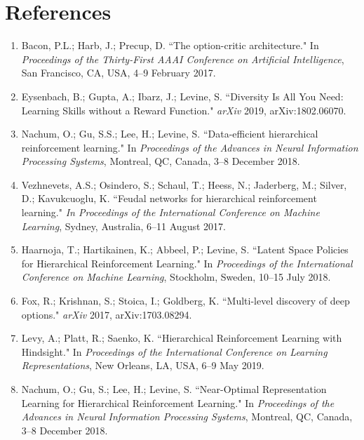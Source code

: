\documentclass[12pt]{article}
\begin{document}
\section{References}
\begin{enumerate}
\item Bacon, P.L.; Harb, J.; Precup, D. ``The option-critic architecture." In \textit{Proceedings of the Thirty-First AAAI Conference on Artificial Intelligence}, San Francisco, CA, USA, 4–9 February 2017.\label{ref140}

\item Eysenbach, B.; Gupta, A.; Ibarz, J.; Levine, S. ``Diversity Is All You Need: Learning Skills without a Reward Function." \textit{arXiv} 2019, arXiv:1802.06070.\label{ref148}

\item Nachum, O.; Gu, S.S.; Lee, H.; Levine, S. ``Data-efficient hierarchical reinforcement learning." In \textit{Proceedings of the Advances in Neural Information Processing Systems}, Montreal, QC, Canada, 3–8 December 2018.\label{ref149}

\item Vezhnevets, A.S.; Osindero, S.; Schaul, T.; Heess, N.; Jaderberg, M.; Silver, D.; Kavukcuoglu, K. ``Feudal networks for hierarchical reinforcement learning." \textit{In Proceedings of the International Conference on Machine Learning}, Sydney, Australia, 6–11 August 2017.\label{ref150}

\item Haarnoja, T.; Hartikainen, K.; Abbeel, P.; Levine, S. ``Latent Space Policies for Hierarchical Reinforcement Learning." In \textit{Proceedings of the International Conference on Machine Learning}, Stockholm, Sweden, 10–15 July 2018.\label{ref155}

\item Fox, R.; Krishnan, S.; Stoica, I.; Goldberg, K. ``Multi-level discovery of deep options." \textit{arXiv} 2017, arXiv:1703.08294.\label{ref162}

\item Levy, A.; Platt, R.; Saenko, K. ``Hierarchical Reinforcement Learning with Hindsight." In \textit{Proceedings of the International Conference on Learning Representations}, New Orleans, LA, USA, 6–9 May 2019.\label{ref223}

\item Nachum, O.; Gu, S.; Lee, H.; Levine, S. ``Near-Optimal Representation Learning for Hierarchical Reinforcement Learning." In \textit{Proceedings of the Advances in Neural Information Processing Systems}, Montreal, QC, Canada, 3–8 December 2018.\label{ref231}

\end{enumerate}
\end{document}
